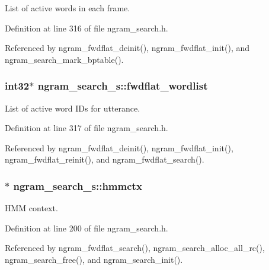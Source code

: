 List of active words in each frame. 



Definition at line 316 of file ngram\-\_\-search.\-h.



Referenced by ngram\-\_\-fwdflat\-\_\-deinit(), ngram\-\_\-fwdflat\-\_\-init(), and ngram\-\_\-search\-\_\-mark\-\_\-bptable().

\subsubsection[{fwdflat\-\_\-wordlist}]{\setlength{\rightskip}{0pt plus 5cm}int32$\ast$ ngram\-\_\-search\-\_\-s\-::fwdflat\-\_\-wordlist}\label{structngram__search__s_a774f1640c5ece856f4bef98d98e7c959}


List of active word I\-Ds for utterance. 



Definition at line 317 of file ngram\-\_\-search.\-h.



Referenced by ngram\-\_\-fwdflat\-\_\-deinit(), ngram\-\_\-fwdflat\-\_\-init(), ngram\-\_\-fwdflat\-\_\-reinit(), and ngram\-\_\-fwdflat\-\_\-search().

\subsubsection[{hmmctx}]{$\ast$ ngram\-\_\-search\-\_\-s\-::hmmctx}\label{structngram__search__s_acfbdd34e3dadbaa384818402f1dd59bf}


H\-M\-M context. 



Definition at line 200 of file ngram\-\_\-search.\-h.



Referenced by ngram\-\_\-fwdflat\-\_\-search(), ngram\-\_\-search\-\_\-alloc\-\_\-all\-\_\-rc(), ngram\-\_\-search\-\_\-free(), and ngram\-\_\-search\-\_\-init().

